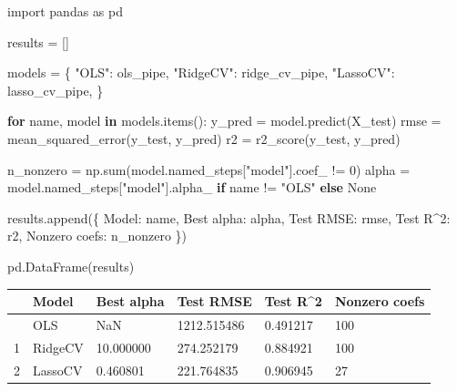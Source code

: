 \documentclass[
  letterpaper,
  DIV=11,
  numbers=noendperiod]{scrreprt}
\newenvironment{Shaded}{\begin{snugshade}}{\end{snugshade}}
\newcommand{\BuiltInTok}[1]{\textcolor[rgb]{0.00,0.23,0.31}{#1}}
\newcommand{\ControlFlowTok}[1]{\textcolor[rgb]{0.00,0.23,0.31}{\textbf{#1}}}
\newcommand{\DecValTok}[1]{\textcolor[rgb]{0.68,0.00,0.00}{#1}}
\newcommand{\ImportTok}[1]{\textcolor[rgb]{0.00,0.46,0.62}{#1}}
\newcommand{\KeywordTok}[1]{\textcolor[rgb]{0.00,0.23,0.31}{\textbf{#1}}}
\newcommand{\NormalTok}[1]{\textcolor[rgb]{0.00,0.23,0.31}{#1}}
\newcommand{\OperatorTok}[1]{\textcolor[rgb]{0.37,0.37,0.37}{#1}}
\newcommand{\StringTok}[1]{\textcolor[rgb]{0.13,0.47,0.30}{#1}}
\newcommand{\VariableTok}[1]{\textcolor[rgb]{0.07,0.07,0.07}{#1}}
\newcounter{none} %
\theoremstyle{definition}
\theoremstyle{definition}
\theoremstyle{plain}
\theoremstyle{plain}
\theoremstyle{remark}
\begin{document}
\begin{Shaded}
\begin{Highlighting}[]
\ImportTok{import}\NormalTok{ pandas }\ImportTok{as}\NormalTok{ pd}

\NormalTok{results }\OperatorTok{=}\NormalTok{ []}

\NormalTok{models }\OperatorTok{=}\NormalTok{ \{}
    \StringTok{"OLS"}\NormalTok{: ols\_pipe,}
    \StringTok{"RidgeCV"}\NormalTok{: ridge\_cv\_pipe,}
    \StringTok{"LassoCV"}\NormalTok{: lasso\_cv\_pipe,}
\NormalTok{\}}

\ControlFlowTok{for}\NormalTok{ name, model }\KeywordTok{in}\NormalTok{ models.items():}
\NormalTok{    y\_pred }\OperatorTok{=}\NormalTok{ model.predict(X\_test)}
\NormalTok{    rmse }\OperatorTok{=}\NormalTok{ mean\_squared\_error(y\_test, y\_pred)}
\NormalTok{    r2 }\OperatorTok{=}\NormalTok{ r2\_score(y\_test, y\_pred)}

\NormalTok{    n\_nonzero }\OperatorTok{=}\NormalTok{ np.}\BuiltInTok{sum}\NormalTok{(model.named\_steps[}\StringTok{"model"}\NormalTok{].coef\_ }\OperatorTok{!=} \DecValTok{0}\NormalTok{)    }
\NormalTok{    alpha }\OperatorTok{=}\NormalTok{ model.named\_steps[}\StringTok{"model"}\NormalTok{].alpha\_ }\ControlFlowTok{if}\NormalTok{ name }\OperatorTok{!=} \StringTok{"OLS"} \ControlFlowTok{else} \VariableTok{None}

\NormalTok{    results.append(\{}
        \StringTok{\textquotesingle{}Model\textquotesingle{}}\NormalTok{: name,}
        \StringTok{\textquotesingle{}Best alpha\textquotesingle{}}\NormalTok{: alpha,}
        \StringTok{\textquotesingle{}Test RMSE\textquotesingle{}}\NormalTok{: rmse,}
        \StringTok{\textquotesingle{}Test R\^{}2\textquotesingle{}}\NormalTok{: r2,}
        \StringTok{\textquotesingle{}Nonzero coefs\textquotesingle{}}\NormalTok{: n\_nonzero}
\NormalTok{    \})}

\NormalTok{pd.DataFrame(results)}
\end{Highlighting}
\end{Shaded}

{\def\LTcaptype{none} %
\begin{longtable}[]{@{}llllll@{}}
\toprule\noalign{}
& Model & Best alpha & Test RMSE & Test R\^{}2 & Nonzero coefs \\
\midrule\noalign{}
\endhead
\bottomrule\noalign{}
\endlastfoot
0 & OLS & NaN & 1212.515486 & 0.491217 & 100 \\
1 & RidgeCV & 10.000000 & 274.252179 & 0.884921 & 100 \\
2 & LassoCV & 0.460801 & 221.764835 & 0.906945 & 27 \\
\end{longtable}
}
\end{document}
